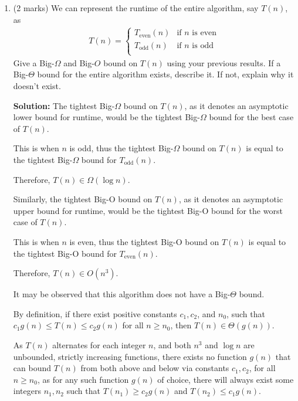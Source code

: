 \documentclass[a4,13pt]{extarticle}
\newenvironment{Solution}{\color{blue}\textbf{Solution:}}{}
\begin{document}
\begin{enumerate}
\begin{enumerate}
	      	      	      	                  
	      	\item (2 marks) We can represent the runtime of the entire algorithm, say $T(n)$, as
	      	      \begin{align*}
	      	      	T(n)=\begin{cases}
	      	      	T_{\text{even}}(n) & \text{if $n$ is even} \\
	      	      	T_{\text{odd}}(n)  & \text{if $n$ is odd}  \\
	      	      	\end{cases}
	      	      \end{align*}
	      	      Give a Big-$\Omega$ and Big-$O$ bound on $T(n)$ using your previous results. If a Big-$\Theta$ bound for the entire algorithm exists, describe it. If not, explain why it doesn’t exist.
	      	      
	      	\begin{Solution}
The tightest Big-$\Omega$ bound on $T(n)$, as it denotes an asymptotic lower bound for runtime, would be the tightest Big-$\Omega$ bound for the best case of $T(n)$.

This is when $n$ is odd, thus the tightest Big-$\Omega$ bound on $T(n)$ is equal to the tightest Big-$\Omega$ bound for $T_{\text{odd}}(n)$.

Therefore, $T(n)\in\Omega(\log n)$.

Similarly, the tightest Big-O bound on $T(n)$, as it denotes an asymptotic upper bound for runtime, would be the tightest Big-O bound for the worst case of $T(n)$.

This is when $n$ is even, thus the tightest Big-O bound on $T(n)$ is equal to the tightest Big-O bound for $T_{\text{even}}(n)$.

Therefore, $T(n)\in O(n^3)$.

It may be observed that this algorithm does not have a Big-$\Theta$ bound.

By definition, if there exist positive constants $c_1, c_2$, and $n_0$, such that $c_1g(n)\le T(n)\le c_2g(n)$ for all $n\geq n_0$, then $T(n)\in\Theta(g(n))$.

As $T(n)$ alternates for each integer $n$, and both $n^3$ and $\log n$ are unbounded, strictly increasing functions, there exists no function $g(n)$ that can bound $T(n)$ from both above and below via constants $c_1, c_2$, for all $n\geq n_0$, as for any such function $g(n)$ of choice, there will always exist some integers $n_1, n_2$ such that $T(n_1)\ge c_2g(n)$ and $T(n_2)\le c_1g(n)$.
	      	\end{Solution}
	      	      	      	                  

\end{enumerate}
\end{enumerate}
\end{document}
